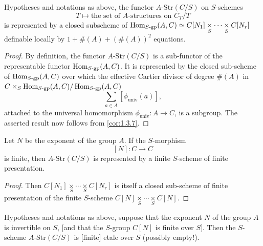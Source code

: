 \begin{proposition}\label{prop:1.6.2}
Hypotheses and notations as above, the functor $A\text{-}\mathrm{Str}(C/S)$ on $S$-schemes
\[
T \mapsto \text{the set of $A$-structures on } C_T/T
\]
is represented by a closed subscheme of $\operatorname{Hom}_{S\text{-}\mathrm{gp}}(A, C) \simeq C[N_1] \underset{S}{\times} \cdots \underset{S}{\times} C[N_r]$ definable locally by $1 + \#(A) + (\#(A))^2$ equations.
\end{proposition}

\begin{proof}
By definition, the functor $A\text{-}\mathrm{Str}(C/S)$ is a sub-functor of the representable functor $\operatorname{Hom}_{S\text{-}\mathrm{gp}}(A, C)$. It is represented by the closed sub-scheme of $\operatorname{Hom}_{S\text{-}\mathrm{gp}}(A, C)$ over which the effective Cartier divisor of degree $\#(A)$ in $C \times_S \operatorname{Hom}_{S\text{-}\mathrm{gp}}(A, C)\allowbreak / \operatorname{Hom}_{S\text{-}\mathrm{gp}}(A, C)$
\[
\sum_{a \in A} [\phi_{\mathrm{univ}}(a)],
\]
attached to the universal homomorphism $\phi_{\mathrm{univ}} : A \to C$, is a subgroup. The asserted result now follows from \ref{cor:1.3.7}.
\end{proof}

\begin{corollary}\label{cor:1.6.3}
Let $N$ be the exponent of the group $A$. If the $S$-morphism
\[
[N] : C \to C
\]
is finite, then $A\text{-}\mathrm{Str}(C/S)$ is represented by a finite $S$-scheme of finite presentation.
\end{corollary}

\begin{proof}
Then $C[N_1] \underset{S}{\times} \cdots \underset{S}{\times} C[N_r]$ is itself a closed sub-scheme of finite presentation of the finite $S$-scheme $C[N] \underset{S}{\times} \cdots \underset{S}{\times} C[N]$.
\end{proof}

\begin{proposition}\label{prop:1.6.4}
Hypotheses and notations as above, suppose that the exponent $N$ of the group $A$ is invertible on $S$, [and that the $S$-group $C[N]$ is finite over $S$]. Then the $S$-scheme $A\text{-}\mathrm{Str}(C/S)$ is [finite] etale over $S$ (possibly empty!).
\end{proposition}

